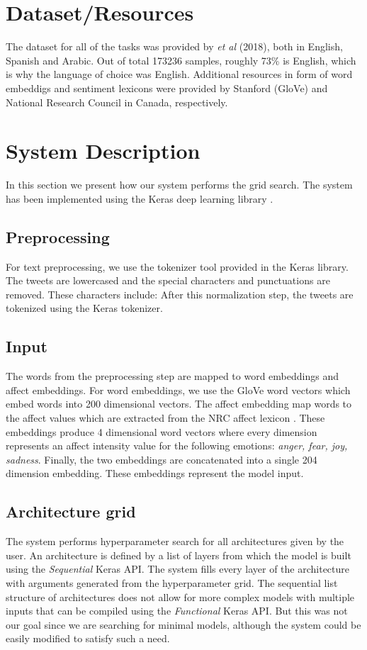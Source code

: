 \documentclass[10pt, a4paper]{article}
\begin{document}
\section{Dataset/Resources}
The dataset for all of the tasks was provided by \citep{mohammed-semeval} \emph{et al} (2018), both in English, Spanish and Arabic. Out of total 173236 samples, roughly 73\% is English, which is why the language of choice was English. Additional resources in form of word embeddigs and sentiment lexicons were provided by Stanford (GloVe) and National Research Council in Canada, respectively. 


\section{System Description}
In this section we present how our system performs the grid search.
The system has been implemented using the Keras deep learning library \citep{chollet2015keras}.

\subsection{Preprocessing}
For text preprocessing, we use the tokenizer tool provided in the Keras library.
The tweets are lowercased and the special characters and
punctuations are removed.
These characters include: %
After this normalization step, the tweets are tokenized using the Keras tokenizer.

\subsection{Input}
The words from the preprocessing step are mapped to word embeddings
and affect embeddings.
For word embeddings, we use the GloVe word vectors \citep{glove} 
which embed words into 200 dimensional vectors.
The affect embedding map words to the affect values which are
extracted from the NRC affect lexicon \citep{DBLP:journals/corr/abs-1802-09233}.
These embeddings produce 4 dimensional word vectors where every
dimension represents an affect intensity value for the following emotions: \textit{anger, fear, joy, sadness}.
Finally, the two embeddings are concatenated into a single 204 dimension embedding.
These embeddings represent the model input.

\subsection{Architecture grid}
The system performs hyperparameter search for all architectures
given by the user. 
An architecture is defined by a list of layers from which
the model is built using the \textit{Sequential} Keras API.
The system fills every layer of the architecture with
arguments generated from the hyperparameter grid.
The sequential list structure of architectures does not
allow for more complex models with multiple inputs that can be
compiled using the \textit{Functional} Keras API.
But this was not our goal since we are searching for minimal models, 
although the system could be easily modified to satisfy such a need.
\end{document}
